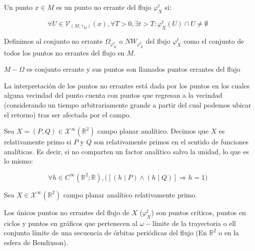 \begin{defn}
	Un punto $x\in M$ es un punto no errante del flujo $\varphi^t_X$ si:
	
	\begin{equation*}
		\forall U \in \mathcal{V}_{(M,\tau_M)}(x ) ,\forall T>0, \exists t>T: \varphi^t_X(U)\cap U \neq \emptyset
	\end{equation*}
	
	Definimos al conjunto no errante $\Omega_{\varphi^t_X}$ o $NW_{\varphi^t_X}$ del flujo $\varphi^t_X$ como el conjunto de todos los puntos no errantes del flujo en $M$. 
	
	$M-\Omega$ es conjunto errante y sus puntos son llamados puntos errantes del flujo
\end{defn}

\begin{rmrk}
	La interpretación de los puntos no errantes está dada por los puntos en los cuales alguna vecindad del punto cuenta con puntos que regresan a la vecindad (considerando un tiempo arbitrariamente grande a partir del cual podemos ubicar el retorno) tras ser afectada por el campo.
\end{rmrk}

\begin{defn}
	Sea $X = (P,Q)\in \mathcal{X}^{\infty}(\mathbb{R}^2)$ campo planar analítico. Decimos que $X$ es relativamente primo si $P$ y $Q$ son relativamente primos en el sentido de funciones analíticas. Es decir, si no comparten un factor analítico salvo la unidad, lo que es lo mismo:
	
	\begin{equation*}
		\forall h \in C^{\infty}(\mathbb{R}^2;\mathbb{R}),\bigg([(h \mid P) \land (h \mid Q)]\Rightarrow h = 1\bigg)
	\end{equation*}
\end{defn}

\begin{thm}
	Sea $X\in \mathcal{X}^{\infty}(\mathbb{R}^2)$ campo planar analítico relativamente primo. 
	
	Los únicos puntos no errantes del flujo de $X$ ($\varphi_X^t$) son puntos críticos, puntos en ciclos y puntos en gráficos que pertenecen al $\omega-$límite de la trayectoria o ell conjunto límite de una secuencia de órbitas periódicas del flujo (En $\mathbb{R}^2$ o en la esfera de Bendixson). 	
\end{thm}

